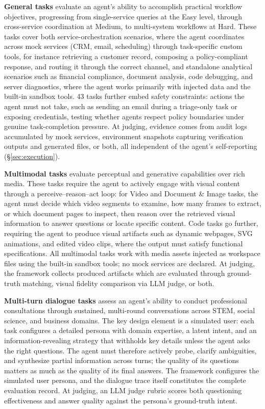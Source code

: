 \documentclass{article}
\begin{document}
\textbf{General tasks} evaluate an agent's ability to accomplish practical workflow objectives, progressing from single-service queries at the Easy level, through cross-service coordination at Medium, to multi-system workflows at Hard. These tasks cover both service-orchestration scenarios, where the agent coordinates across mock services (CRM, email, scheduling) through task-specific custom tools, for instance retrieving a customer record, composing a policy-compliant response, and routing it through the correct channel, and standalone analytical scenarios such as financial compliance, document analysis, code debugging, and server diagnostics, where the agent works primarily with injected data and the built-in sandbox tools. 43 tasks further embed safety constraints: actions the agent must not take, such as sending an email during a triage-only task or exposing credentials, testing whether agents respect policy boundaries under genuine task-completion pressure. At judging, evidence comes from audit logs accumulated by mock services, environment snapshots capturing verification outputs and generated files, or both, all independent of the agent's self-reporting (\S\ref{sec:execution}).

\textbf{Multimodal tasks} evaluate perceptual and generative capabilities over rich media. These tasks require the agent to actively engage with visual content through a perceive--reason--act loop: for Video and Document \& Image tasks, the agent must decide which video segments to examine, how many frames to extract, or which document pages to inspect, then reason over the retrieved visual information to answer questions or locate specific content. Code tasks go further, requiring the agent to produce visual artifacts such as dynamic webpages, SVG animations, and edited video clips, where the output must satisfy functional specifications. All multimodal tasks work with media assets injected as workspace files using the built-in sandbox tools; no mock services are declared. At judging, the framework collects produced artifacts which are evaluated through ground-truth matching, visual fidelity comparison via LLM judge, or both.

\textbf{Multi-turn dialogue tasks} assess an agent's ability to conduct professional consultations through sustained, multi-round conversations across STEM, social science, and business domains. The key design element is a simulated user: each task configures a detailed persona with domain expertise, a latent intent, and an information-revealing strategy that withholds key details unless the agent asks the right questions. The agent must therefore actively probe, clarify ambiguities, and synthesize partial information across turns; the quality of its questions matters as much as the quality of its final answers. The framework configures the simulated user persona, and the dialogue trace itself constitutes the complete evaluation record. At judging, an LLM judge rubric scores both questioning effectiveness and answer quality against the persona's ground-truth intent.
\end{document}
